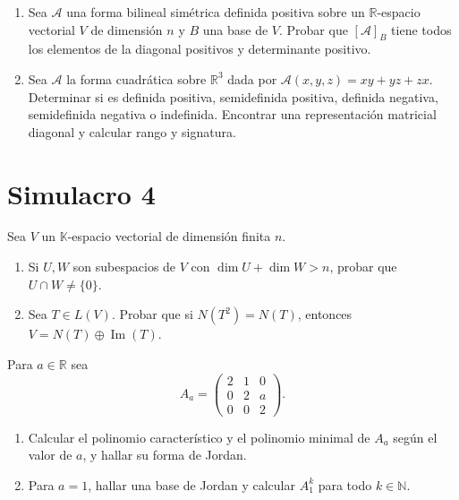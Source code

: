 \documentclass{article}
\newcommand{\R}{\mathbb{R}}
\newcommand{\N}{\mathbb{N}}
\newcommand{\K}{\mathbb{K}}
\DeclareMathOperator{\Ima}{Im}
\newcommand{\A}{\mathcal{A}}
\newenvironment{ejercicio}[1]{\begin{trivlist}
\item[\hskip \labelsep {\bfseries #1.}]}{\end{trivlist}}
\begin{document}
\begin{ejercicio}{5}
    \begin{enumerate}
        \item Sea \( \A \) una forma bilineal simétrica definida positiva sobre un \( \R \)-espacio vectorial \( V \) de dimensión \( n \) y \( B \) una base de \( V \). Probar que \( [\A]_B \) tiene todos los elementos de la diagonal positivos y determinante positivo.
        \item Sea \( \A \) la forma cuadrática sobre \( \R^3 \) dada por \( \A(x, y, z) = xy + yz + zx \). Determinar si es definida positiva, semidefinida positiva, definida negativa, semidefinida negativa o indefinida. Encontrar una representación matricial diagonal y calcular rango y signatura.
    \end{enumerate}
\end{ejercicio}

\newpage
\section*{Simulacro 4}

\begin{ejercicio}{1}
    Sea \( V \) un \( \K \)-espacio vectorial de dimensión finita \( n \).
    \begin{enumerate}
        \item Si \( U, W \) son subespacios de \( V \) con \( \dim U + \dim W > n \), probar que \( U \cap W \neq \{0\} \).
        \item Sea \( T \in L(V) \). Probar que si \( N(T^2) = N(T) \), entonces \( V = N(T) \oplus \Ima(T) \).
    \end{enumerate}
\end{ejercicio}

\begin{ejercicio}{2}
    Para \( a \in \R \) sea
    \[ A_a = \begin{pmatrix} 2 & 1 & 0 \\ 0 & 2 & a \\ 0 & 0 & 2 \end{pmatrix}. \]
    \begin{enumerate}
        \item Calcular el polinomio característico y el polinomio minimal de \( A_a \) según el valor de \( a \), y hallar su forma de Jordan.
        \item Para \( a = 1 \), hallar una base de Jordan y calcular \( A_1^k \) para todo \( k \in \N \).
    \end{enumerate}
\end{ejercicio}
\end{document}
